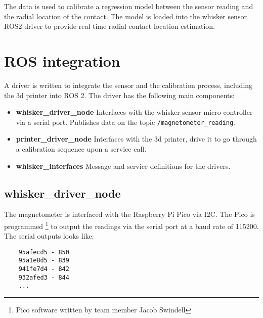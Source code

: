 \documentclass{report}
\begin{document}
The data is used to calibrate a regression model between the sensor reading and the radial location of the contact. The model is loaded into the whisker sensor ROS2 driver to provide real time radial contact location estimation.

\vspace{20px}


\section{ROS integration}

A driver is written to integrate the sensor and the calibration process, including the 3d printer into ROS 2. The driver has the following main components:

\begin{itemize}
    \item \textbf{whisker\_driver\_node} Interfaces with the whisker sensor micro-controller via a serial port. Publishes data on the topic \verb|/magnetometer_reading|.
    \item  \textbf{printer\_driver\_node} Interfaces with the 3d printer, drive it to go through a calibration sequence upon a service call.
    \item \textbf{whisker\_interfaces} Message and service definitions for the drivers.
\end{itemize}

\subsection{whisker\_driver\_node}

The magnetometer is interfaced with the Raspberry Pi Pico via I2C. The Pico is programmed \footnote{Pico software written by team member Jacob Swindell} to output the readings via the serial port at a baud rate of 115200. The serial outputs looks like:
\begin{verbatim}
    95afecd5 - 850
    95a1e8d5 - 839
    941fe7d4 - 842
    932afed3 - 844
    ...
\end{verbatim}
\end{document}
